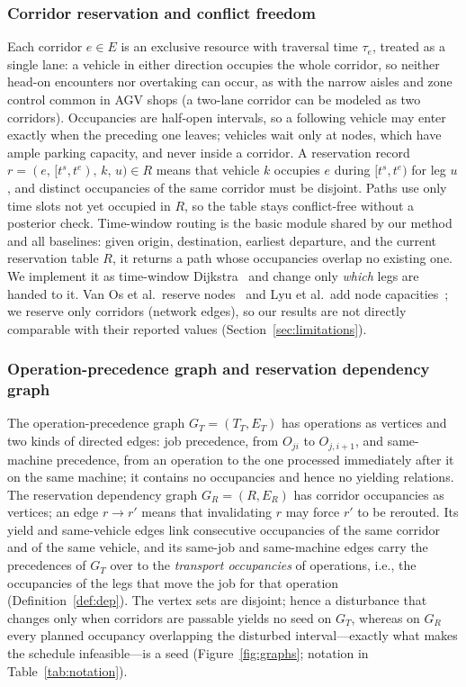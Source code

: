 \documentclass[manuscript,screen,review]{acmart}
\begin{document}
\subsubsection{Corridor reservation and conflict freedom}
\label{sec:reservation}

Each corridor \(e\in E\) is an exclusive resource with traversal time \(\tau_e\), treated as a single lane: a vehicle in either direction occupies the whole corridor, so neither head-on encounters nor overtaking can occur,
as with the narrow aisles and zone control common in AGV shops (a two-lane corridor can be modeled as two corridors).
Occupancies are half-open intervals, so a following vehicle may enter exactly when the preceding one leaves; vehicles wait only at nodes, which have ample parking capacity, and never inside a corridor.
A reservation record \(r=(e,\,[t^s,t^e),\,k,\,u)\in R\) means that vehicle \(k\) occupies \(e\) during \([t^s,t^e)\) for leg \(u\), and distinct occupancies of the same corridor must be disjoint.
Paths use only time slots not yet occupied in \(R\), so the table stays conflict-free without a posterior check.
Time-window routing is the basic module shared by our method and all baselines: given origin, destination, earliest departure, and the current reservation table \(R\), it returns a path whose occupancies overlap no existing one.
We implement it as time-window Dijkstra~\cite{sun2023integrated} and change only \emph{which} legs are handed to it.
Van Os et al.\ reserve nodes~\cite{vanos2026exact} and Lyu et al.\ add node capacities~\cite{lyu2019approach}; we reserve only corridors (network edges), so our results are not directly comparable with their reported values (Section~\ref{sec:limitations}).

\subsubsection{Operation-precedence graph and reservation dependency graph}
\label{sec:two_graphs}

The operation-precedence graph \(G_T=(T_T,E_T)\) has operations as vertices and two kinds of directed edges: job precedence, from \(O_{ji}\) to \(O_{j,i+1}\), and same-machine precedence, from an operation to the one processed immediately after it on the same machine; it contains no occupancies and hence no yielding relations.
The reservation dependency graph \(G_R=(R,E_R)\) has corridor occupancies as vertices; an edge \(r\to r'\) means that invalidating \(r\) may force \(r'\) to be rerouted.
Its yield and same-vehicle edges link consecutive occupancies of the same corridor and of the same vehicle, and its same-job and same-machine edges carry the precedences of \(G_T\) over to the \emph{transport occupancies} of operations, i.e., the occupancies of the legs that move the job for that operation (Definition~\ref{def:dep}).
The vertex sets are disjoint; hence a disturbance that changes only when corridors are passable yields no seed on \(G_T\), whereas on \(G_R\) every planned occupancy overlapping the disturbed interval---exactly what makes the schedule infeasible---is a seed
(Figure~\ref{fig:graphs}; notation in Table~\ref{tab:notation}).
\end{document}

